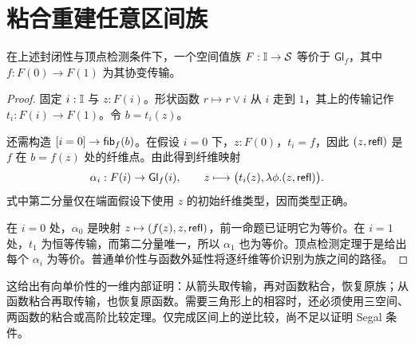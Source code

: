 \section{粘合重建任意区间族}
\begin{theorem}[粘合逆比较]
在上述封闭性与顶点检测条件下，一个空间值族 $F:\mathbb I\to\mathcal S$ 等价于 $\mathsf{Gl}_f$，其中 $f:F(0)\to F(1)$ 为其协变传输。
\end{theorem}
\begin{proof}
固定 $i:\mathbb I$ 与 $z:F(i)$。形状函数 $r\mapsto r\vee i$ 从 $i$ 走到 $1$，其上的传输记作 $t_i:F(i)\to F(1)$。令 $b=t_i(z)$。

还需构造 $[i=0]\to\mathsf{fib}_f(b)$。在假设 $i=0$ 下，$z:F(0)$，$t_i=f$，因此 $(z,\mathsf{refl})$ 是 $f$ 在 $b=f(z)$ 处的纤维点。由此得到纤维映射
\[
\alpha_i:F(i)\to\mathsf{Gl}_f(i),
\qquad z\longmapsto\bigl(t_i(z),\lambda\phi.(z,\mathsf{refl})\bigr).
\]
式中第二分量仅在端面假设下使用 $z$ 的初始纤维类型，因而类型正确。

在 $i=0$ 处，$\alpha_0$ 是映射
$z\mapsto(f(z),z,\mathsf{refl})$，前一命题已证明它为等价。在 $i=1$ 处，$t_1$ 为恒等传输，而第二分量唯一，所以 $\alpha_1$ 也为等价。顶点检测定理于是给出每个 $\alpha_i$ 为等价。普通单价性与函数外延性将逐纤维等价识别为族之间的路径。
\end{proof}
\begin{remark}
这给出有向单价性的一维内部证明：从箭头取传输，再对函数粘合，恢复原族；从函数粘合再取传输，也恢复原函数。需要三角形上的相容时，还必须使用三空间、两函数的粘合或高阶比较定理。仅完成区间上的逆比较，尚不足以证明 Segal 条件。
\end{remark}

